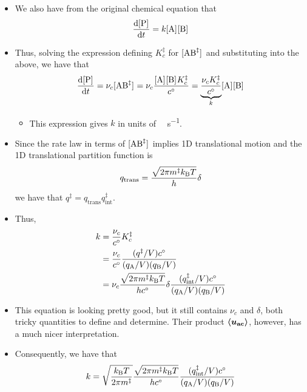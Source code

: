 \documentclass[../notes.tex]{subfiles}
\begin{document}
\begin{itemize}
\begin{itemize}
\begin{itemize}
        \end{itemize}
        \item We also have from the original chemical equation that
        \begin{equation*}
            \dv{\cnc{P}}{t} = k\cnc{A}\cnc{B}
        \end{equation*}
        \item Thus, solving the expression defining $K_c^\ddagger$ for $\cnc{AB^\ddagger}$ and substituting into the above, we have that
        \begin{equation*}
            \dv{\cnc{P}}{t} = \nu_c\cnc{AB^\ddagger}
            = \nu_c\frac{\cnc{A}\cnc{B}K_c^\ddagger}{c^\circ}
            = \underbrace{\frac{\nu_cK_c^\ddagger}{c^\circ}}_k\cnc{A}\cnc{B}
        \end{equation*}
        \begin{itemize}
            \item This expression gives $k$ in units of \si{\per\molar\per\second}.
        \end{itemize}
        \item Since the rate law in terms of $\cnc{AB^\ddagger}$ implies 1D translational motion and the 1D translational partition function is
        \begin{equation*}
            q_\text{trans} = \frac{\sqrt{2\pi m^\ddagger k_\text{B} T}}{h}\delta
        \end{equation*}
        we have that $q^\ddagger=q_\text{trans}q_\text{int}^\ddagger$.
        \item Thus,
        \begin{align*}
            k &= \frac{\nu_c}{c^\circ}K_c^\ddagger\\
            &= \frac{\nu_c}{c^\circ}\frac{(q^\ddagger/V)c^\circ}{(q_{\ce{A}}/V)(q_{\ce{B}}/V)}\\
            &= \nu_c\frac{\sqrt{2\pi m^\ddagger\kB T}}{hc^\circ}\delta\frac{(q_\text{int}^\ddagger/V)c^\circ}{(q_{\ce{A}}/V)(q_{\ce{B}}/V)}
        \end{align*}
        \item This equation is looking pretty good, but it still contains $\nu_c$ and $\delta$, both tricky quantities to define and determine. Their product $\bm{\left\langle{u_\textbf{ac}}\right\rangle}$, however, has a much nicer interpretation.
        \item Consequently, we have that
        \begin{align*}
            k &= \sqrt{\frac{\kB T}{2\pi m^\ddagger}}\frac{\sqrt{2\pi m^\ddagger\kB T}}{hc^\circ}\frac{(q_\text{int}^\ddagger/V)c^\circ}{(q_{\ce{A}}/V)(q_{\ce{B}}/V)}\\

\end{align*}
\end{itemize}
\end{itemize}
\end{document}

